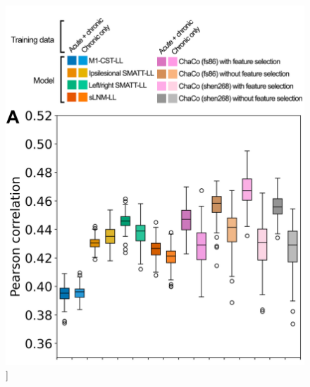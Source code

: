 \documentclass[phd,tocprelim]{cornell}
\renewcommand{\caption}[1]{\singlespacing\hangcaption{#1}\normalspacing}
\begin{document}
\null
\vfill
\clearpage
\null
\vfill
\begin{figure}[h!]
		\ContinuedFloat
		\captionsetup{labelformat=adja-page}
    \centering
    \includegraphics[width=1\textwidth]{chapter3/Figure1A.png}
    \caption[]{}
\end{figure}
\null
\vfill
\clearpage
\null
\vfill
\end{document}
